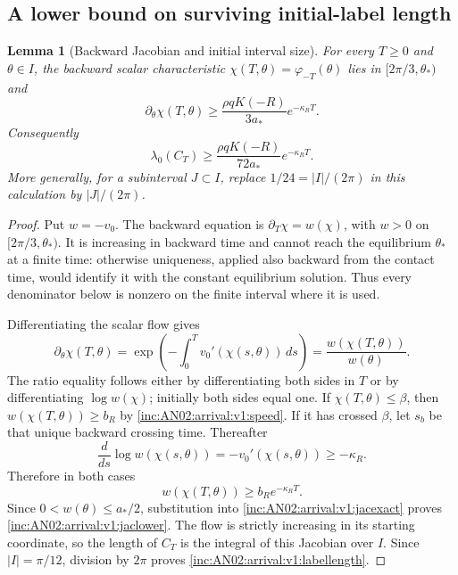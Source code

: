 \documentclass[11pt]{article}
\numberwithin{equation}{section}
\newtheorem{lemma}[theorem]{Lemma}
\theoremstyle{remark}
\newcommand{\dd}{\,d}
\begin{document}
\subsection{A lower bound on surviving initial-label length}
\begin{lemma}[Backward Jacobian and initial interval size]
\label{inc:AN02:arrival:v1:jacobian}
For every $T\ge0$ and $\theta\in I$, the backward scalar characteristic
$\chi(T,\theta)=\varphi_{-T}(\theta)$ lies in
$[2\pi/3,\theta_*)$ and
\begin{equation}\label{inc:AN02:arrival:v1:jaclower}
 \partial_\theta\chi(T,\theta)
 \ge\frac{\rho qK(-R)}{3a_*}e^{-\kappa_R T}.
\end{equation}
Consequently
\begin{equation}\label{inc:AN02:arrival:v1:labellength}
 \lambda_0(C_T)\ge
 \frac{\rho qK(-R)}{72a_*}e^{-\kappa_R T}.
\end{equation}
More generally, for a subinterval $J\subset I$, replace $1/24=|I|/(2\pi)$
in this calculation by $|J|/(2\pi)$.
\end{lemma}
\begin{proof}
Put $w=-v_0$. The backward equation is $\partial_T\chi=w(\chi)$,
with $w>0$ on $[2\pi/3,\theta_*)$. It is increasing in backward time
and cannot reach the equilibrium $\theta_*$ at a finite time: otherwise
uniqueness, applied also backward from the contact time, would identify
it with the constant equilibrium solution. Thus every denominator below
is nonzero on the finite interval where it is used.

Differentiating the scalar flow gives
\begin{equation}\label{inc:AN02:arrival:v1:jacexact}
 \partial_\theta\chi(T,\theta)
 =\exp\!\left(-\int_0^T v_0'(\chi(s,\theta))\dd s\right)
 =\frac{w(\chi(T,\theta))}{w(\theta)}.
\end{equation}
The ratio equality follows either by differentiating both sides in $T$
or by differentiating $\log w(\chi)$; initially both sides equal one.
If $\chi(T,\theta)\le\beta$, then
$w(\chi(T,\theta))\ge b_R$ by
\eqref{inc:AN02:arrival:v1:speed}. If it has crossed $\beta$, let $s_b$
be that unique backward crossing time. Thereafter
\[
 \frac d{ds}\log w(\chi(s,\theta))
 =-v_0'(\chi(s,\theta))\ge-\kappa_R.
\]
Therefore in both cases
\[
 w(\chi(T,\theta))\ge b_Re^{-\kappa_R T}.
\]
Since $0<w(\theta)\le a_*/2$, substitution into
\eqref{inc:AN02:arrival:v1:jacexact} proves
\eqref{inc:AN02:arrival:v1:jaclower}. The flow is strictly increasing in
its starting coordinate, so the length of $C_T$ is the integral of this
Jacobian over $I$. Since $|I|=\pi/12$, division by $2\pi$ proves
\eqref{inc:AN02:arrival:v1:labellength}.
\end{proof}
\end{document}
